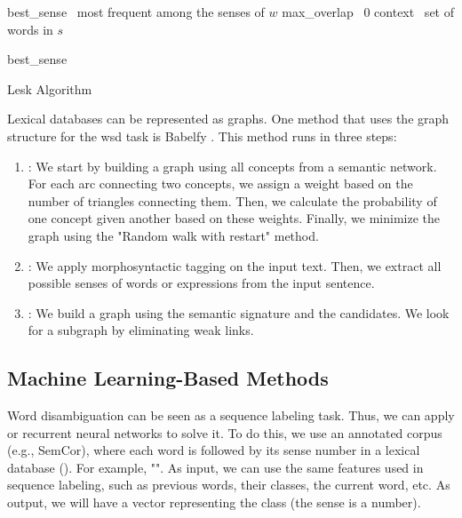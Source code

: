 \documentclass{KBook}
\begin{document}
\begin{algorithm}[ht]
	
	best\_sense \textleftarrow\ most frequent among the senses of $w$\;
	max\_overlap \textleftarrow\ 0\;
	context \textleftarrow\ set of words in $s$\; 
	
	
	\Return best\_sense \;
	\caption{Lesk Algorithm}
	\label{algo:lesk}
\end{algorithm}

Lexical databases can be represented as graphs. One method that uses the graph structure for the \ac{wsd} task is Babelfy \cite{2014-moro-al}. This method runs in three steps:
\begin{enumerate}  
	\item {}: We start by building a graph using all concepts from a semantic network. For each arc connecting two concepts, we assign a weight based on the number of triangles connecting them. Then, we calculate the probability of one concept given another based on these weights. Finally, we minimize the graph using the "Random walk with restart" method.
	
	\item {}: We apply morphosyntactic tagging on the input text. Then, we extract all possible senses of words or expressions from the input sentence.
	
	\item {}: We build a graph using the semantic signature and the candidates. We look for a subgraph by eliminating weak links.
\end{enumerate}

\subsection{Machine Learning-Based Methods}

Word disambiguation can be seen as a sequence labeling task. Thus, we can apply  or recurrent neural networks to solve it. To do this, we use an annotated corpus (e.g., SemCor), where each word is followed by its sense number in a lexical database (). For example, "". As input, we can use the same features used in sequence labeling, such as previous words, their classes, the current word, etc. As output, we will have a  vector representing the class (the sense is a number).
\end{document}
